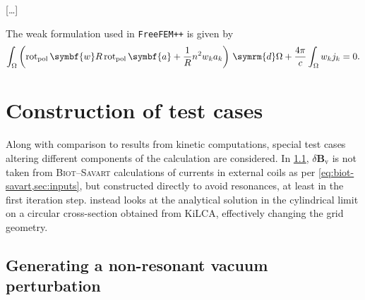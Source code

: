 \documentclass[a4paper, twoside, 10pt, english]{article}
\numberwithin{equation}{section}
\let\vec\symbf
\newcommand*\diff{\ensuremath{\symrm{d}}}  %
\newcommand*\pol{\ensuremath{\textrm{pol}}}  %
\newcommand*\polCurl{\ensuremath{\operatorname{rot}_{\pol}}}  %
\newcommand*\Bvac{\ensuremath{\delta \vec{B}_{\text{v}}}}  %
\begin{document}
[\ldots]

The weak formulation used in \texttt{FreeFEM++} is given by  %
\begin{gather}
  \int_{\Omega} \left ( \polCurl \vec{w} R \polCurl \vec{a} + \frac{1}{R} n^{2} w_{k} a_{k} \right ) \, \diff \Omega + \frac{4 \pi}{c} \int_{\Omega} w_{k} j_{k} = 0.
\end{gather}


\clearpage
\section{Construction of test cases}

Along with comparison to results from kinetic computations, special test cases altering different components of the calculation are considered. In \cref{sec:nonres}, $\Bvac$ is not taken from \textsc{Biot}--\textsc{Savart} calculations of currents in external coils as per \cref{eq:biot-savart,sec:inputs}, but constructed directly to avoid resonances, at least in the first iteration step.  instead looks at the analytical solution in the cylindrical limit on a circular cross-section obtained from KiLCA, effectively changing the grid geometry.

\subsection{Generating a non-resonant vacuum perturbation}
\label{sec:nonres}
\end{document}

